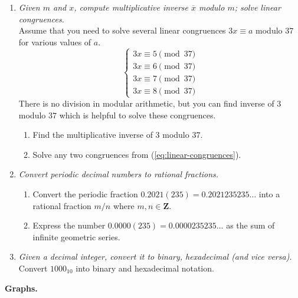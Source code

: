 \documentclass[a4paper,12pt]{article}
\newcommand\Z{\mathbf{Z}}
\begin{document}
\begin{enumerate}
\item {\small \em
Given $m$ and $x$, compute
multiplicative inverse $\overline{x}$ modulo $m$; solve linear congruences.}\\
Assume that you need to solve several linear congruences $3x \equiv a$ modulo $37$
for various values of $a$.
\begin{equation}
\label{eq:linear-congruences}
\left\{ \begin{array}{l}
3x \equiv 5 \pmod{37} \\
3x \equiv 6 \pmod{37} \\
3x \equiv 7 \pmod{37} \\
3x \equiv 8 \pmod{37}
\end{array} \right.
\end{equation}
There is no division in modular arithmetic, but you can find inverse of $3$
modulo $37$ which is helpful to solve these congruences.
\begin{enumerate}
\item Find the multiplicative inverse of $3$ modulo $37$.
\item Solve any two congruences from (\ref{eq:linear-congruences}).
\end{enumerate}



\item {\small \em
Convert periodic decimal numbers to rational fractions.}\\
\begin{enumerate}
\item
Convert the periodic fraction $0.2021(235) = 0.2021235235\ldots$ into a rational
fraction $m/n$ where $m,n \in \Z$.
\item
Express the number $0.0000(235) = 0.0000235235\ldots$ as the sum
of infinite geometric series.
\end{enumerate}


\item {\small \em
Given a decimal integer, convert it to binary, hexadecimal (and vice versa).}\\
Convert $1000_{10}$ into binary and hexadecimal notation.
\end{enumerate}





\vspace{10pt}
{\bf Graphs.}
\end{document}
